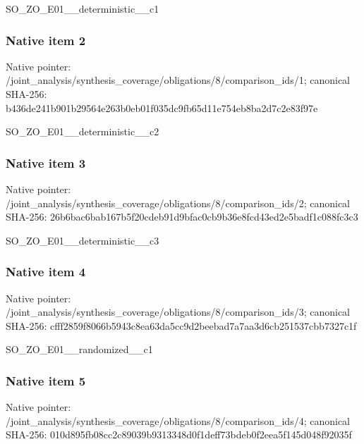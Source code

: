 \documentclass[10pt,a4paper]{article}
\begin{document}
\begingroup\raggedright\sloppy SO\_\allowbreak{}ZO\_\allowbreak{}E01\_\allowbreak{}\_\allowbreak{}deterministic\_\allowbreak{}\_\allowbreak{}c1\par\endgroup

\subsubsection{Native item 2}
Native pointer: /joint\_\allowbreak{}analysis/synthesis\_\allowbreak{}coverage/obligations/8/comparison\_\allowbreak{}ids/1; canonical SHA-256: b436de241b901b29564e263b0eb01f035dc9fb65d11e754eb8ba2d7c2e83f97e

\begingroup\raggedright\sloppy SO\_\allowbreak{}ZO\_\allowbreak{}E01\_\allowbreak{}\_\allowbreak{}deterministic\_\allowbreak{}\_\allowbreak{}c2\par\endgroup

\subsubsection{Native item 3}
Native pointer: /joint\_\allowbreak{}analysis/synthesis\_\allowbreak{}coverage/obligations/8/comparison\_\allowbreak{}ids/2; canonical SHA-256: 26b6bac6bab167b5f20cdeb91d9bfac0cb9b36e8fcd43ed2e5badf1c088fc3c3

\begingroup\raggedright\sloppy SO\_\allowbreak{}ZO\_\allowbreak{}E01\_\allowbreak{}\_\allowbreak{}deterministic\_\allowbreak{}\_\allowbreak{}c3\par\endgroup

\subsubsection{Native item 4}
Native pointer: /joint\_\allowbreak{}analysis/synthesis\_\allowbreak{}coverage/obligations/8/comparison\_\allowbreak{}ids/3; canonical SHA-256: cfff2859f8066b5943c8ea63da5cc9d2beebad7a7aa3d6cb251537cbb7327c1f

\begingroup\raggedright\sloppy SO\_\allowbreak{}ZO\_\allowbreak{}E01\_\allowbreak{}\_\allowbreak{}randomized\_\allowbreak{}\_\allowbreak{}c1\par\endgroup

\subsubsection{Native item 5}
Native pointer: /joint\_\allowbreak{}analysis/synthesis\_\allowbreak{}coverage/obligations/8/comparison\_\allowbreak{}ids/4; canonical SHA-256: 010d895fb08cc2c89039b9313348d0f1deff73bdeb0f2eea5f145d048f92035f
\end{document}
